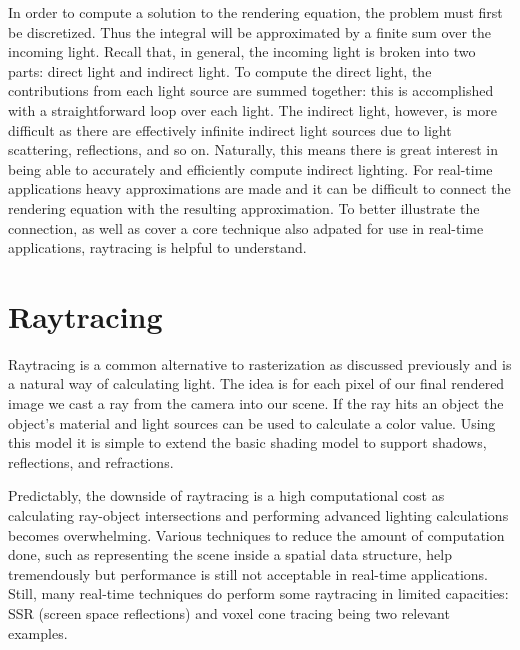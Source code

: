 In order to compute a solution to the rendering equation, the problem must first be discretized. Thus the integral will be approximated by a finite sum over the incoming light. Recall that, in general, the incoming light is broken into two parts: direct light and indirect light. To compute the direct light, the contributions from each light source are summed together: this is accomplished with a straightforward loop over each light. The indirect light, however, is more difficult as there are effectively infinite indirect light sources due to light scattering, reflections, and so on. Naturally, this means there is great interest in being able to accurately and efficiently compute indirect lighting. For real-time applications heavy approximations are made and it can be difficult to connect the rendering equation with the resulting approximation. To better illustrate the connection, as well as cover a core technique also adpated for use in real-time applications, raytracing is helpful to understand.

\section{Raytracing}
Raytracing is a common alternative to rasterization as discussed previously and is a natural way of calculating light. The idea is for each pixel of our final rendered image we cast a ray from the camera into our scene. If the ray hits an object the object's material and light sources can be used to calculate a color value. Using this model it is simple to extend the basic shading model to support shadows, reflections, and refractions.

Predictably, the downside of raytracing is a high computational cost as calculating ray-object intersections and performing advanced lighting calculations becomes overwhelming. Various techniques to reduce the amount of computation done, such as representing the scene inside a spatial data structure, help tremendously but performance is still not acceptable in real-time applications. Still, many real-time techniques do perform some raytracing in limited capacities: SSR (screen space reflections) and voxel cone tracing being two relevant examples.

